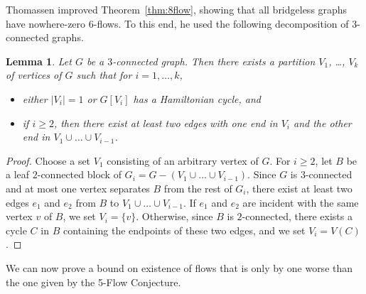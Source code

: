 \documentclass[12pt,twoside,openright,a4paper]{book}
\newtheorem{lemma}[theorem]{Lemma}
\begin{document}
Thomassen improved Theorem~\ref{thm:8flow}, showing that all bridgeless graphs have nowhere-zero $6$-flows.   To this end, he used
the following decomposition of $3$-connected graphs.
\begin{lemma}\label{lemma:descent}
Let $G$ be a $3$-connected graph.  Then there
exists a partition $V_1$, \ldots, $V_k$ of vertices of $G$ such that for $i=1, \ldots, k$,
\begin{itemize}
\item either $|V_i|=1$ or $G[V_i]$ has a Hamiltonian cycle, and
\item if $i\ge 2$, then there exist at least two edges with one end in $V_i$ and the other end in $V_1\cup\ldots\cup V_{i-1}$.
\end{itemize}
\end{lemma}
\begin{proof}
Choose a set $V_1$ consisting of an arbitrary vertex of $G$.  For $i\ge 2$, let $B$ be a leaf $2$-connected block of $G_i=G-(V_1\cup \ldots\cup V_{i-1})$.
Since $G$ is $3$-connected and at most one vertex separates $B$ from the rest of $G_i$, there exist at least two edges $e_1$ and $e_2$ from $B$ to
$V_1\cup \ldots\cup V_{i-1}$.  If $e_1$ and $e_2$ are incident with the same vertex $v$ of $B$, we set $V_i=\{v\}$.
Otherwise, since $B$ is $2$-connected, there exists a cycle $C$ in $B$ containing the endpoints of these two edges,
and we set $V_i=V(C)$.
\end{proof}

We can now prove a bound on existence of flows that is only by one worse than the one given by the 5-Flow Conjecture.
\end{document}
